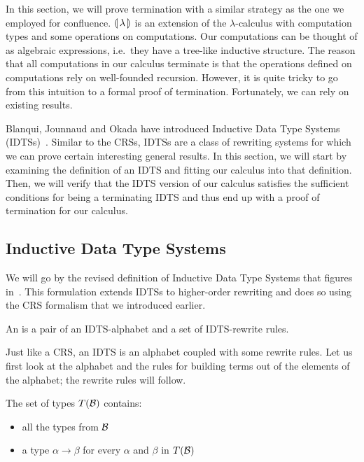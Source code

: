 In this section, we will prove termination with a similar strategy as the
one we employed for confluence. $\llparenthesis \, \lambda \, \rrparenthesis$ is an extension of the
$\lambda$-calculus with computation types and some operations on
computations. Our computations can be thought of as algebraic expressions,
i.e.\ they have a tree-like inductive structure. The reason that all
computations in our calculus terminate is that the operations defined on
computations rely on well-founded recursion. However, it is quite tricky to
go from this intuition to a formal proof of termination. Fortunately, we
can rely on existing results.

Blanqui, Jounnaud and Okada have introduced Inductive Data Type Systems
(IDTSs)~\cite{blanqui2002inductive,blanqui2000termination}. Similar to the
CRSs, IDTSs are a class of rewriting systems for which we can prove certain
interesting general results. In this section, we will start by examining
the definition of an IDTS and fitting our calculus into that
definition. Then, we will verify that the IDTS version of our calculus
satisfies the sufficient conditions for being a terminating IDTS and thus
end up with a proof of termination for our calculus.

\subsection{Inductive Data Type Systems}
\label{ssec:idts}

We will go by the revised definition of Inductive Data Type Systems that
figures in~\cite{blanqui2000termination}. This formulation extends IDTSs to
higher-order rewriting and does so using the CRS formalism that we
introduced earlier.

\begin{definition}
  An  is a pair of an IDTS-alphabet
  and a set of IDTS-rewrite rules.
\end{definition}

Just like a CRS, an IDTS is an alphabet coupled with some rewrite
rules. Let us first look at the alphabet and the rules for building terms
out of the elements of the alphabet; the rewrite rules will follow.

\begin{definition}
  The set of types $T(\mathcal{B})$ contains:
  \begin{itemize}
  \item all the types from $\mathcal{B}$
  \item a type $\alpha \to \beta$ for every $\alpha$ and $\beta$ in $T(\mathcal{B})$
  \end{itemize}
\end{definition}

